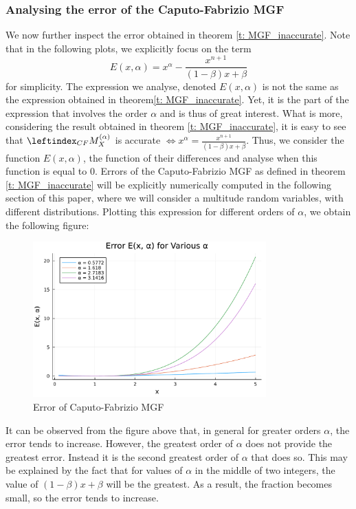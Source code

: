 \subsubsection{Analysing the error of the Caputo-Fabrizio MGF}
We now further inspect the error obtained in theorem \ref{t: MGF_inaccurate}. Note that in the following plots, we explicitly focus on the term \[ E(x, \alpha) = x^\alpha - \displaystyle \frac{x^{n+1} }{(1 - \beta)x + \beta}\] for simplicity. The expression we analyse, denoted \(E(x, \alpha)\) is not the same as the expression obtained in theorem\ref{t: MGF_inaccurate}. Yet, it is the part of the expression that involves the order \(\alpha\) and is thus of great interest. What is more, considering the result obtained in theorem \ref{t: MGF_inaccurate}, it is easy to see that \(\leftindex_{CF}{M}_X^{(\alpha)}\) is accurate \(\iff x^\alpha = \displaystyle \frac{x^{n+1} }{(1 - \beta)x + \beta}\). Thus, we consider the function \(E(x, \alpha)\), the function of their differences and analyse when this function is equal to 0. Errors of the Caputo-Fabrizio MGF as defined in theorem \ref{t: MGF_inaccurate} will be explicitly numerically computed in the following section of this paper, where we will consider a multitude random variables, with different distributions. Plotting this expression for different orders of \(\alpha\), we obtain the following figure:
\begin{figure}[H]
    \centering
    \includegraphics[width=0.8\textwidth]{figures/error_plot.pdf}
    \caption{Error of Caputo-Fabrizio MGF}
    \label{fig:error_MGF}
\end{figure}
It can be observed from the figure above that, in general for greater orders \(\alpha\), the error tends to increase. However, the greatest order of \(\alpha\) does not provide the greatest error. Instead it is the second greatest order of \(\alpha\) that does so. This may be explained by the fact that for values of \(\alpha\) in the middle of two integers, the value of \((1 - \beta)x + \beta\) will be the greatest. As a result, the fraction becomes small, so the error tends to increase.

